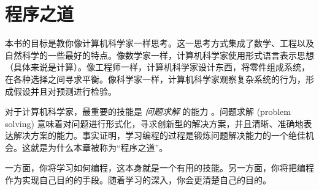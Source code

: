 


\chapter{程序之道}


本书的目标是教你像计算机科学家一样思考。这一思考方式集成了数学、工程以及自然科学的一些最好的特点。像数学家一样，计算机科学家使用形式语言表示思想（具体来说是计算）。像工程师一样，计算机科学家设计东西，将零件组成系统，在各种选择之间寻求平衡。像科学家一样，计算机科学家观察复杂系统的行为，形成假设并且对预测进行检验。
  


对于计算机科学家，最重要的技能是 {\em 问题求解} 的能力 。问题求解 (problem solving) 意味着对问题进行形式化，寻求创新型的解决方案，并且清晰、准确地表达解决方案的能力。事实证明，学习编程的过程是锻炼问题解决能力的一个绝佳机会。这就是为什么本章被称为“程序之道”。


一方面，你将学习如何编程，这本身就是一个有用的技能。另一方面，你将把编程作为实现自己目的的手段。随着学习的深入，你会更清楚自己的目的。

